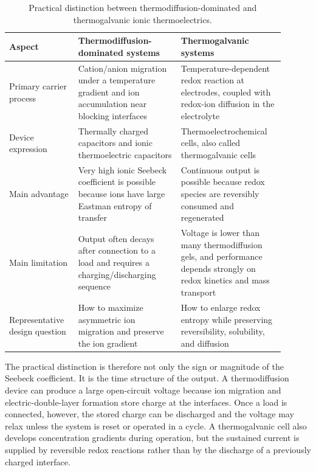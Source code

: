 \documentclass[a4paper,12pt]{report}
\begin{document}
\begin{table}[H]
\centering
\caption{Practical distinction between thermodiffusion-dominated and
thermogalvanic ionic thermoelectrics.}
\footnotesize
\begin{tabular}{>{\raggedright\arraybackslash}p{0.22\linewidth}
>{\raggedright\arraybackslash}p{0.34\linewidth}
>{\raggedright\arraybackslash}p{0.34\linewidth}}
\toprule
Aspect & Thermodiffusion-dominated systems & Thermogalvanic systems \\
\midrule
Primary carrier process & Cation/anion migration under a temperature gradient
and ion accumulation near blocking interfaces & Temperature-dependent redox
reaction at electrodes, coupled with redox-ion diffusion in the electrolyte \\
Device expression & Thermally charged capacitors and ionic thermoelectric
capacitors & Thermoelectrochemical cells, also called thermogalvanic cells \\
Main advantage & Very high ionic Seebeck coefficient is possible because ions
have large Eastman entropy of transfer & Continuous output is possible because
redox species are reversibly consumed and regenerated \\
Main limitation & Output often decays after connection to a load and requires a
charging/discharging sequence & Voltage is lower than many thermodiffusion
gels, and performance depends strongly on redox kinetics and mass transport \\
Representative design question & How to maximize asymmetric ion migration and
preserve the ion gradient & How to enlarge redox entropy while preserving
reversibility, solubility, and diffusion \\
\bottomrule
\end{tabular}
\end{table}

The practical distinction is therefore not only the sign or magnitude of the
Seebeck coefficient. It is the time structure of the output. A thermodiffusion
device can produce a large open-circuit voltage because ion migration and
electric-double-layer formation store charge at the interfaces. Once a load is
connected, however, the stored charge can be discharged and the voltage may
relax unless the system is reset or operated in a cycle. A thermogalvanic cell
also develops concentration gradients during operation, but the sustained current
is supplied by reversible redox reactions rather than by the discharge of a previously
charged interface.
\end{document}

